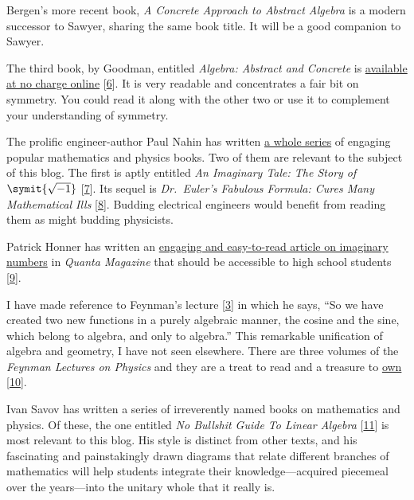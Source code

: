 \documentclass[
  a4paper,
]{article}
\begin{document}
Bergen's more recent book, \emph{A Concrete Approach to Abstract
Algebra} is a modern successor to Sawyer, sharing the same book title.
It will be a good companion to Sawyer.

The third book, by Goodman, entitled \emph{Algebra: Abstract and
Concrete} is
\href{http://homepage.divms.uiowa.edu/~goodman/algebrabook.dir/book.2.6.pdf}{available
at no charge online} {[}\protect\hyperlink{ref-goodman2012}{6}{]}. It is
very readable and concentrates a fair bit on symmetry. You could read it
along with the other two or use it to complement your understanding of
symmetry.

The prolific engineer-author Paul Nahin has written
\href{https://www.amazon.in/stores/Paul-J.-Nahin/author/B001HCS1XI/allbooks}{a
whole series} of engaging popular mathematics and physics books. Two of
them are relevant to the subject of this blog. The first is aptly
entitled \emph{An Imaginary Tale: The Story of \(\symit{\sqrt{-1}}\)}
{[}\protect\hyperlink{ref-nahin-imaginary}{7}{]}. Its sequel is
\emph{Dr.~Euler's Fabulous Formula: Cures Many Mathematical Ills}
{[}\protect\hyperlink{ref-nahin-euler}{8}{]}. Budding electrical
engineers would benefit from reading them as might budding physicists.

Patrick Honner has written an
\href{https://www.quantamagazine.org/the-imaginary-numbers-at-the-edge-of-reality-20181025/}{engaging
and easy-to-read article on imaginary numbers} in \emph{Quanta Magazine}
that should be accessible to high school students
{[}\protect\hyperlink{ref-honner2018}{9}{]}.

I have made reference to Feynman's lecture
{[}\protect\hyperlink{ref-feynman22}{3}{]} in which he says, ``So we
have created two new functions in a purely algebraic manner, the cosine
and the sine, which belong to algebra, and only to algebra.'' This
remarkable unification of algebra and geometry, I have not seen
elsewhere. There are three volumes of the \emph{Feynman Lectures on
Physics} and they are a treat to read and a treasure to
\href{https://www.amazon.in/Feynman-Lectures-Physics-Vol-Bundle/dp/9332580952}{own}
{[}\protect\hyperlink{ref-feynman123}{10}{]}.

Ivan Savov has written a series of irreverently named books on
mathematics and physics. Of these, the one entitled \emph{No Bullshit
Guide To Linear Algebra} {[}\protect\hyperlink{ref-savov2020}{11}{]} is
most relevant to this blog. His style is distinct from other texts, and
his fascinating and painstakingly drawn diagrams that relate different
branches of mathematics will help students integrate their
knowledge---acquired piecemeal over the years---into the unitary whole
that it really is.
\end{document}
